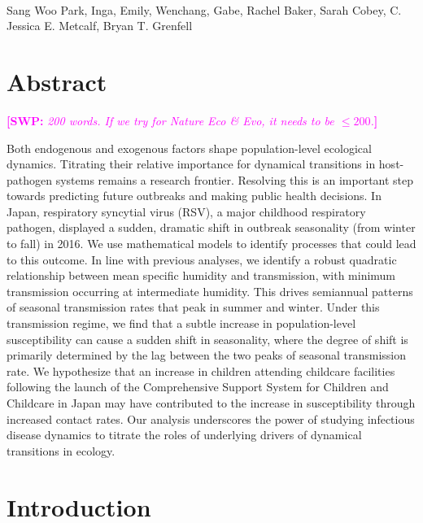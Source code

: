 \documentclass[12pt]{article}
\date{\today}
\newcommand{\comment}{\showcomment}
\newcommand{\showcomment}[3]{\textcolor{#1}{\textbf{[#2: }\textsl{#3}\textbf{]}}}
\newcommand{\swp}[1]{\comment{magenta}{SWP}{#1}}
\begin{document}
\begin{flushleft}{
	\Large
	\textbf{}
}
\newline
\\
Sang Woo Park, Inga, Emily, Wenchang, Gabe, Rachel Baker, Sarah Cobey, C. Jessica E. Metcalf, Bryan T. Grenfell
\bigskip
\end{flushleft}

\section*{Abstract} \swp{200 words. If we try for Nature Eco \& Evo, it needs to be $\leq 200$.}

Both endogenous and exogenous factors shape population-level ecological dynamics. Titrating their relative importance for dynamical transitions in host-pathogen systems remains a research frontier. Resolving this is an important step towards predicting future outbreaks and making public health decisions.
In Japan, respiratory syncytial virus (RSV), a major childhood respiratory pathogen, displayed a sudden, dramatic shift in outbreak seasonality (from winter to fall) in 2016. We use mathematical models to identify processes that could lead to this outcome.
In line with previous analyses, we identify a robust quadratic relationship between mean specific humidity and transmission, with minimum transmission occurring at intermediate humidity.
This drives semiannual patterns of seasonal transmission rates that peak in summer and winter.
Under this transmission regime, we find that a subtle increase in population-level susceptibility can cause a sudden shift in seasonality, where the degree of shift is primarily determined by the lag between the two peaks of seasonal transmission rate.
We hypothesize that an increase in children attending childcare facilities following the launch of the Comprehensive Support System for Children and Childcare in Japan may have contributed to the increase in susceptibility through increased contact rates.
Our analysis underscores the power of studying infectious disease dynamics to titrate the roles of underlying drivers of dynamical transitions in ecology.

\pagebreak

\section*{Introduction}
\end{document}
